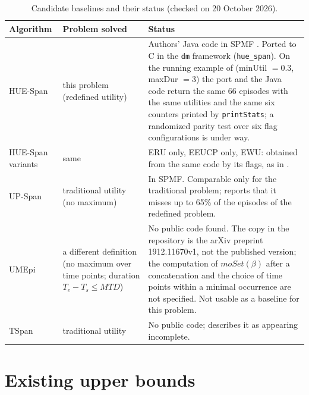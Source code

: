 \documentclass[11pt]{article}
\newcommand{\HUESpan}{\textsf{HUE-Span}}
\newcommand{\UMEpi}{\textsf{UMEpi}}
\newcommand{\UPSpan}{\textsf{UP-Span}}
\newcommand{\TSpan}{\textsf{TSpan}}
\begin{document}
\begin{table}[h]
\centering\small
\caption{Candidate baselines and their status (checked on 20 October 2026).}
\begin{tabular}{p{2.6cm}p{3.6cm}p{7.6cm}}
\toprule
Algorithm & Problem solved & Status \\
\midrule
\HUESpan{} \cite{fournier2019huespan} & this problem (redefined utility) & Authors' Java code in SPMF \cite{fournier2016spmf}. Ported to C in the \texttt{dm} framework (\texttt{hue\_span}). On the running example of \cite{fournier2019huespan} (minUtil $=0.3$, maxDur $=3$) the port and the Java code return the same 66 episodes with the same utilities and the same six counters printed by \texttt{printStats}; a randomized parity test over six flag configurations is under way. \\
\HUESpan{} variants & same & ERU only, EEUCP only, EWU: obtained from the same code by its flags, as in \cite[Fig.~3]{fournier2019huespan}. \\
\UPSpan{} \cite{wu2013mining} & traditional utility (no maximum) & In SPMF. Comparable only for the traditional problem; \cite{fournier2019huespan} reports that it misses up to 65\% of the episodes of the redefined problem. \\
\UMEpi{} \cite{gan2023discovering} & a different definition (no maximum over time points; duration $T_e - T_s \le \mathit{MTD}$) & No public code found. The copy in the repository is the arXiv preprint 1912.11670v1, not the published version; the computation of $\mathit{moSet}(\beta)$ after a concatenation and the choice of time points within a minimal occurrence are not specified. Not usable as a baseline for this problem. \\
\TSpan{} \cite{guo2014high} & traditional utility & No public code; \cite{fournier2019huespan} describes it as appearing incomplete. \\
\bottomrule
\end{tabular}
\end{table}

\section{Existing upper bounds}\label{sec:bounds}
\end{document}
